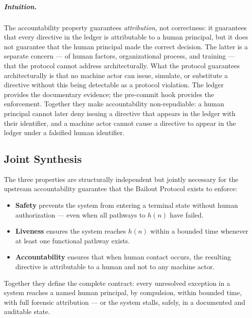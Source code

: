 \subparagraph{Intuition.} The accountability property guarantees \emph{attribution}, not correctness: it guarantees that every directive in the ledger is attributable to a human principal, but it does not guarantee that the human principal made the correct decision. The latter is a separate concern — of human factors, organizational process, and training — that the protocol cannot address architecturally. What the protocol guarantees architecturally is that no machine actor can issue, simulate, or substitute a directive without this being detectable as a protocol violation. The ledger provides the documentary evidence; the pre-commit hook provides the enforcement. Together they make accountability non-repudiable: a human principal cannot later deny issuing a directive that appears in the ledger with their identifier, and a machine actor cannot cause a directive to appear in the ledger under a falsified human identifier.

\subsection{Joint Synthesis}

The three properties are structurally independent but jointly necessary for the upstream accountability guarantee that the Bailout Protocol exists to enforce:

\begin{itemize}
\item \textbf{Safety} prevents the system from entering a terminal state without human authorization — even when all pathways to $h(n)$ have failed.
\item \textbf{Liveness} ensures the system reaches $h(n)$ within a bounded time whenever at least one functional pathway exists.
\item \textbf{Accountability} ensures that when human contact occurs, the resulting directive is attributable to a human and not to any machine actor.
\end{itemize}

Together they define the complete contract: every unresolved exception in a \bxthree{} system reaches a named human principal, by compulsion, within bounded time, with full forensic attribution — or the system stalls, safely, in a documented and auditable state.